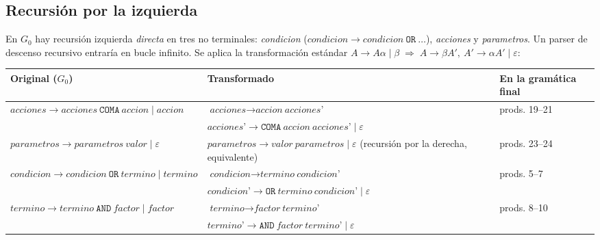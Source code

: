 \subsection{Recursión por la izquierda}
En $G_0$ hay recursión izquierda \emph{directa} en tres no terminales: \textit{condicion} ($\textit{condicion}\to\textit{condicion}\ \texttt{OR}\ \dots$),
\textit{acciones} y \textit{parametros}. Un parser de descenso recursivo entraría en bucle infinito. Se aplica la
transformación estándar $A\to A\alpha\mid\beta \;\Longrightarrow\; A\to\beta A',\ A'\to\alpha A'\mid\varepsilon$:

\begin{center}\small
\begin{tabular}{@{}>{\raggedright\arraybackslash}p{5.2cm} >{\raggedright\arraybackslash}p{7.3cm} >{\raggedright\arraybackslash}p{2.6cm}@{}}
\toprule
\textbf{Original ($G_0$)} & \textbf{Transformado} & \textbf{En la gramática final} \\
\midrule
$\textit{acciones}\to\textit{acciones}\ \texttt{COMA}\ \textit{accion}\mid\textit{accion}$ &
$\textit{acciones}\to\textit{accion}\ \textit{acciones'}$ & prods. 19--21 \\
 & $\textit{acciones'}\to\texttt{COMA}\ \textit{accion}\ \textit{acciones'}\mid\varepsilon$ & \\
$\textit{parametros}\to\textit{parametros}\ \textit{valor}\mid\varepsilon$ &
$\textit{parametros}\to\textit{valor}\ \textit{parametros}\mid\varepsilon$ (recursión por la derecha, equivalente) & prods. 23--24 \\
$\textit{condicion}\to\textit{condicion}\ \texttt{OR}\ \textit{termino}\mid\textit{termino}$ &
$\textit{condicion}\to\textit{termino}\ \textit{condicion'}$ & prods. 5--7 \\
 & $\textit{condicion'}\to\texttt{OR}\ \textit{termino}\ \textit{condicion'}\mid\varepsilon$ & \\
$\textit{termino}\to\textit{termino}\ \texttt{AND}\ \textit{factor}\mid\textit{factor}$ &
$\textit{termino}\to\textit{factor}\ \textit{termino'}$ & prods. 8--10 \\
 & $\textit{termino'}\to\texttt{AND}\ \textit{factor}\ \textit{termino'}\mid\varepsilon$ & \\
\bottomrule
\end{tabular}
\end{center}


